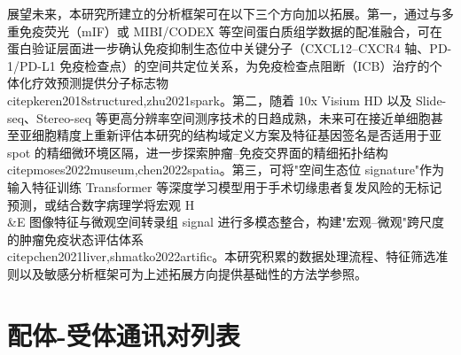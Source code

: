 \documentclass[12pt, a4paper]{ctexart}
\begin{document}
\vspace{0.4cm}

展望未来，本研究所建立的分析框架可在以下三个方向加以拓展。第一，通过与多重免疫荧光（mIF）或 MIBI/CODEX 等空间蛋白质组学数据的配准融合，可在蛋白验证层面进一步确认免疫抑制生态位中关键分子（CXCL12--CXCR4 轴、PD-1/PD-L1 免疫检查点）的空间共定位关系，为免疫检查点阻断（ICB）治疗的个体化疗效预测提供分子标志物~\\citep{keren2018structured,zhu2021spark}。第二，随着 10x Visium HD 以及 Slide-seq、Stereo-seq 等更高分辨率空间测序技术的日趋成熟，未来可在接近单细胞甚至亚细胞精度上重新评估本研究的结构域定义方案及特征基因签名是否适用于亚 spot 的精细微环境区隔，进一步探索肿瘤--免疫交界面的精细拓扑结构~\\citep{moses2022museum,chen2022spatia}。第三，可将"空间生态位 signature"作为输入特征训练 Transformer 等深度学习模型用于手术切缘患者复发风险的无标记预测，或结合数字病理学将宏观 H\\&E 图像特征与微观空间转录组 signal 进行多模态整合，构建"宏观--微观"跨尺度的肿瘤免疫状态评估体系~\\citep{chen2021liver,shmatko2022artific}。本研究积累的数据处理流程、特征筛选准则以及敏感分析框架可为上述拓展方向提供基础性的方法学参照。


\newpage
\appendix
\renewcommand{\thesection}{\Alph{section}}

\section{配体-受体通讯对列表}
\label{app:lr_table}
\end{document}

